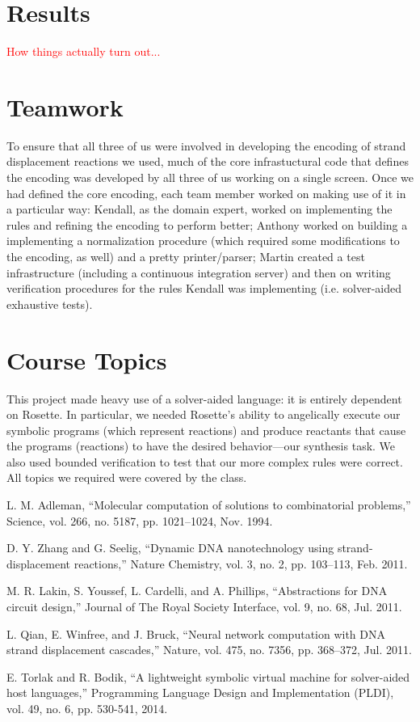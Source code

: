 \documentclass{article}
\begin{document}
\section{Results}

\textcolor{red}{How things actually turn out...}

\section{Teamwork}

To ensure that all three of us were involved in developing the encoding of
strand displacement reactions we used, much of the core infrastuctural code
that defines the encoding was developed by all three of us working on a single
screen. Once we had defined the core encoding, each team member worked on
making use of it in a particular way: Kendall, as the domain expert, worked
on implementing the rules and refining the encoding to perform better; Anthony
worked on building a implementing a normalization procedure (which required
some modifications to the encoding, as well) and a pretty printer/parser;
Martin created a test infrastructure (including a continuous integration server)
and then on writing verification procedures for the rules Kendall was
implementing (i.e. solver-aided exhaustive tests).

\section{Course Topics}

This project made heavy use of a solver-aided language: it is entirely dependent
on Rosette. In particular, we needed Rosette's ability to angelically execute
our symbolic programs (which represent reactions) and produce reactants that
cause the programs (reactions) to have the desired behavior---our synthesis
task. We also used bounded verification to test that our more complex
rules were correct. All topics we required were covered by the class.

\begin{thebibliography}{9}

L. M. Adleman,
“Molecular computation of solutions to combinatorial problems,”
Science, vol. 266, no. 5187, pp. 1021–1024, Nov. 1994.

D. Y. Zhang and G. Seelig,
“Dynamic DNA nanotechnology using strand-displacement reactions,”
Nature Chemistry, vol. 3, no. 2, pp. 103–113, Feb. 2011.

M. R. Lakin, S. Youssef, L. Cardelli, and A. Phillips,
“Abstractions for DNA circuit design,”
Journal of The Royal Society Interface, vol. 9, no. 68, Jul. 2011.

L. Qian, E. Winfree, and J. Bruck, “Neural network computation with DNA strand
displacement cascades,” Nature, vol. 475, no. 7356, pp. 368–372, Jul. 2011.

  E. Torlak and R. Bodik, “A lightweight symbolic virtual machine for solver-aided host languages,” Programming Language Design and Implementation (PLDI), vol. 49, no. 6, pp. 530-541, 2014.

\end{thebibliography}
\end{document}
